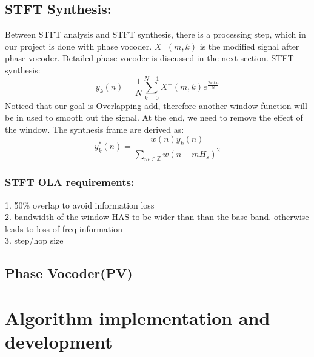 \documentclass{article}
\begin{document}
\subsection{STFT Synthesis:}
Between STFT analysis and STFT synthesis, there is a processing step, which in our project is done with phase vocoder. $X^{+}(m,k)$ is the modified signal after phase vocoder. Detailed phase vocoder is discussed in the next section. 
STFT synthesis: 
\begin{equation}
        y_k(n) = \frac{1}{N}\sum_{k=0}^{N-1} X^{+}(m,k) e^{\frac{2\pi i k n}{N}} 
\end{equation}
Noticed that our goal is Overlapping add, therefore another window function will be in used to smooth out the signal. At the end, we need to remove the effect of the window. The synthesis frame are derived as:
\begin{equation}
        y^{*}_k(n) = \frac{w(n)y_k(n)}{\sum_{m\in \mathbb{Z}}w(n-mH_s)^2}
\end{equation}
\subsubsection*{STFT OLA requirements:}
1. 50\% overlap to avoid information loss\\
2. bandwidth of the window HAS to be wider than than the base band. otherwise leads to loss of freq information\\
3. step/hop size


\subsection{Phase Vocoder(PV)}
\section{Algorithm implementation and development }
\end{document}
